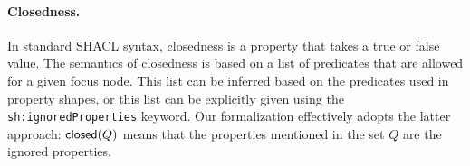 


\paragraph{Closedness.} In standard SHACL syntax, closedness is a property that takes a true or false value. The semantics of closedness is based on a list of predicates that are allowed for a given focus node. This list can be inferred based on the predicates used in property shapes, or this list can be explicitly given using the \texttt{sh:ignoredProperties} keyword. Our formalization effectively adopts the latter approach: $\mathsf{closed}(Q)$ means that the properties mentioned in the set $Q$ are the ignored properties.

